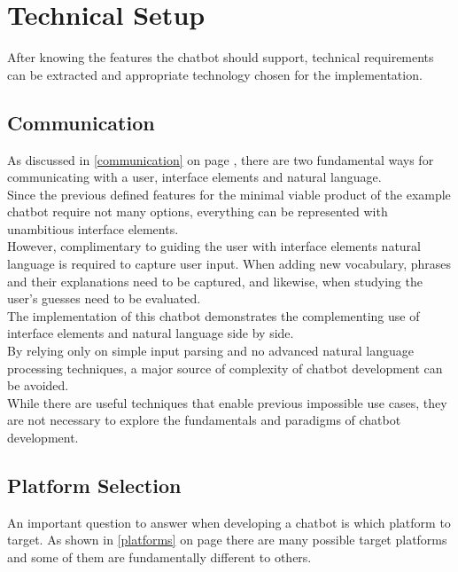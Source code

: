 \section{Technical Setup}


After knowing the features the chatbot should support,
technical requirements can be extracted
and appropriate technology chosen for the implementation.


\subsection{Communication}

As discussed in \ref{communication} on page \pageref{communication},
there are two fundamental ways for communicating with a user,
interface elements and natural language.
\\

Since the previous defined features for the minimal viable product of the example chatbot require not many options,
everything can be represented with unambitious interface elements.
\\

However, complimentary to guiding the user with interface elements
natural language is required to capture user input.
When adding new vocabulary, phrases and their explanations need to be captured,
and likewise, when studying the user's guesses need to be evaluated.
\\

The implementation of this chatbot demonstrates the complementing use of interface elements and natural language side by side.
\\

By relying only on simple input parsing and no advanced natural language processing techniques,
a major source of complexity of chatbot development can be avoided.
\\
While there are useful techniques that enable previous impossible use cases,
they are not necessary to explore the fundamentals and paradigms of chatbot development.
\\

\subsection{Platform Selection}

An important question to answer when developing a chatbot is which platform to target.
As shown in \ref{platforms} on page \pageref{platforms} there are many possible target platforms
and some of them are fundamentally different to others.
\\

